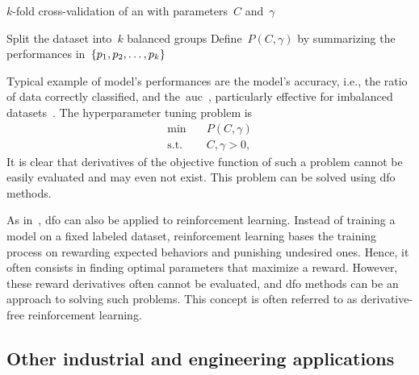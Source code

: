 \begin{algorithm}
    \caption{$k$-fold cross-validation of an  with parameters~$C$ and~$\gamma$}
    \label{alg:cross-validation}
    \DontPrintSemicolon
    \onehalfspacing
    Split the dataset into~$k$ balanced groups\;
    Define~$P(C, \gamma)$ by summarizing the performances in~$\{p_1, p_2, \dots, p_k\}$\;
\end{algorithm}

Typical example of model's performances are the model's accuracy, i.e., the ratio of data correctly classified, and the~\gls{auc}~\cite{Hanley_Mcneil_1982}, particularly effective for imbalanced datasets~\cite{Bradley_1997}.
The hyperparameter tuning problem is
\begin{align*}
    \min        & \quad P(C, \gamma)\\
    \text{s.t.} & \quad C, \gamma > 0,
\end{align*}
It is clear that derivatives of the objective function of such a problem cannot be easily evaluated and may even not exist.
This problem can be solved using \gls{dfo} methods.

As in~\cite{Qian_Yu_2021}, \gls{dfo} can also be applied to reinforcement learning.
Instead of training a model on a fixed labeled dataset, reinforcement learning bases the training process on rewarding expected behaviors and punishing undesired ones.
Hence, it often consists in finding optimal parameters that maximize a reward.
However, these reward derivatives often cannot be evaluated, and \gls{dfo} methods can be an approach to solving such problems.
This concept is often referred to as derivative-free reinforcement learning.

\subsection{Other industrial and engineering applications}

